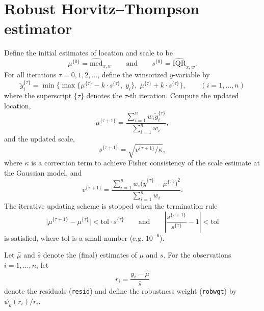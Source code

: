 \documentclass[a4paper,11pt]{scrreprt}
\theoremstyle{remark}
\begin{document}
\chapter{Robust Horvitz--Thompson estimator}\label{ch:ht}
Define the initial estimates of location and scale to be
\begin{equation*}
   \mu^{\{0\}} = \widehat{\mathrm{med}}_{x,w} \qquad \text{and} \qquad s^{\{0\}} = \widehat{\mathrm{IQR}}_{x,w}.
\end{equation*}
\noindent For all iterations $\tau=0,1,2, \ldots$, define the winsorized $y$-variable by
\begin{equation*}
   \tilde{y}_i^{\{\tau\}} = \min\big\{ \max\big\{ \mu^{\{\tau\}} - k \cdot s^{\{\tau\}}, \; y_i \big\},\; \mu^{\{\tau\}} + k \cdot s^{\{\tau\}} \big\}, \qquad (i=1,\ldots,n)
\end{equation*}
\noindent where the superscript $\{\tau\}$ denotes the $\tau$-th iteration. Compute the updated location, 
\begin{equation*}
   \mu^{\{\tau + 1\}} = \frac{\sum_{i=1}^n w_i \tilde{y}_i^{\{\tau\}} }{\sum_{i=1}^n w_i},
\end{equation*}
\noindent and the updated scale,
\begin{equation*}
   s^{\{\tau + 1\}} = \sqrt{v^{\{\tau + 1\}}/\kappa},
\end{equation*}
\noindent where  $\kappa$ is a correction term to achieve Fisher consistency of the scale estimate at the Gaussian model, and
\begin{equation*}
   v^{\{\tau + 1\}} = \frac{\sum_{i=1}^n w_i \big(\tilde{y}^{\{\tau\}} - \mu^{\{\tau\}}\big)^2}{\sum_{i=1}^n w_i}.
\end{equation*}
\noindent The iterative updating scheme is stopped when the termination rule
\begin{equation*}
   \Big\vert \mu^{\{\tau + 1\}} - \mu^{\{\tau\}} \Big\vert  < \mathrm{tol} \cdot s^{\{\tau\}} \qquad \text{and} \qquad \left\vert \frac{s^{\{\tau + 1\}}}{s^{\{\tau\}}} - 1 \right\vert < \mathrm{tol}
\end{equation*}
\noindent is satisfied, where $\mathrm{tol}$ is a small number (e.g. $10^{-6}$). 

Let $\hat{\mu}$ and $\hat{s}$ denote the (final) estimates of $\mu$ and $s$. For the observations $i=1,\ldots,n$, let  
\begin{equation*}
   r_i = \frac{y_i - \hat{\mu}}{\hat{s}}
\end{equation*}
\noindent denote the residuals (\texttt{resid}) and define the robustness weight (\texttt{robwgt}) by $\psi_k(r_i)/r_i$. 
\end{document}
